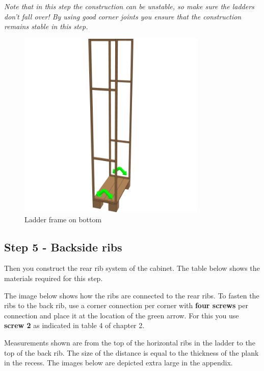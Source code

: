\documentclass{article}
\begin{document}
\begin{center}
\textit{Note that in this step the construction can be unstable, so make sure the ladders don't fall over! By using good corner joints you ensure that the construction remains stable in this step.}
\end{center}

\begin{figure}[h!]
    \centering
    \includegraphics[width=0.8\textwidth]{scene 4 - geraamte.png}
    \caption{Ladder frame on bottom}
    \label{fig:stap 4}
\end{figure}

\clearpage
\newpage

\subsection{Step 5 - Backside ribs}

Then you construct the rear rib system of the cabinet. The table below shows the materials required for this step.



The image below shows how the ribs are connected to the rear ribs. To fasten the ribs to the back rib, use a corner connection per corner with \textbf{four screws} per connection and place it at the location of the green arrow. For this you use \textbf{screw 2} as indicated in table 4 of chapter 2.

Measurements shown are from the top of the horizontal ribs in the ladder to the top of the back rib. The size of the distance is equal to the thickness of the plank in the recess. The images below are depicted extra large in the appendix.
\end{document}
